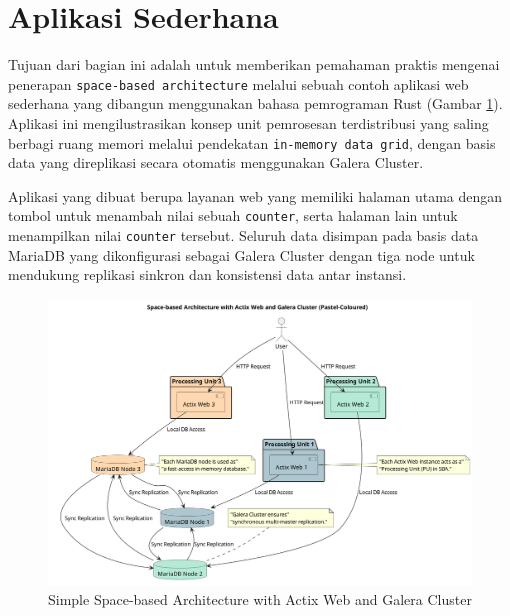 \section{Aplikasi Sederhana}

Tujuan dari bagian ini adalah untuk memberikan pemahaman praktis mengenai penerapan \texttt{space-based architecture} melalui sebuah contoh aplikasi web sederhana yang dibangun menggunakan bahasa pemrograman Rust (Gambar \ref{fig:simple_space-based_architecture}). Aplikasi ini mengilustrasikan konsep unit pemrosesan terdistribusi yang saling berbagi ruang memori melalui pendekatan \texttt{in-memory data grid}, dengan basis data yang direplikasi secara otomatis menggunakan Galera Cluster.

Aplikasi yang dibuat berupa layanan web yang memiliki halaman utama dengan tombol untuk menambah nilai sebuah \texttt{counter}, serta halaman lain untuk menampilkan nilai \texttt{counter} tersebut. Seluruh data disimpan pada basis data MariaDB yang dikonfigurasi sebagai Galera Cluster dengan tiga node untuk mendukung replikasi sinkron dan konsistensi data antar instansi.

\begin{figure}
	\centering
	\includegraphics[width=\textwidth]{../images/out/space-based_architecture.png}
	\caption{Simple Space-based Architecture with Actix Web and Galera Cluster}
	\label{fig:simple_space-based_architecture}
\end{figure}

